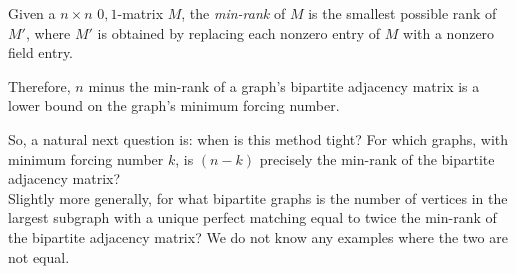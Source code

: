 \begin{fdef}
	Given a $n \times n$ $0,1$-matrix $M$, the \emph{min-rank} of $M$ is the smallest possible rank of $M'$, where $M'$ is obtained by replacing each nonzero entry of $M$ with a nonzero field entry.
\end{fdef}

Therefore, $n$ minus the min-rank of a graph's bipartite adjacency matrix is a lower bound on the graph's minimum forcing number.

So, a natural next question is: when is this method tight? For which graphs, with minimum forcing number $k$, is $(n-k)$ precisely the min-rank of the bipartite adjacency matrix?\\
Slightly more generally, for what bipartite graphs is the number of vertices in the largest subgraph with a unique perfect matching equal to twice the min-rank of the bipartite adjacency matrix? We do not know any examples where the two are not equal.

